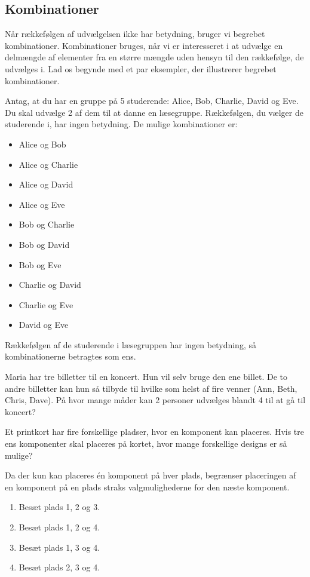 \subsection*{Kombinationer}

Når rækkefølgen af udvælgelsen ikke har betydning, bruger vi begrebet kombinationer. Kombinationer bruges, når vi er interesseret i at udvælge en delmængde af elementer fra en større mængde uden hensyn til den rækkefølge, de udvælges i. Lad os begynde med et par eksempler, der illustrerer begrebet kombinationer.

\begin{example}
    Antag, at du har en gruppe på 5 studerende: Alice, Bob, Charlie, David og Eve. Du skal udvælge 2 af dem til at danne en læsegruppe. Rækkefølgen, du vælger de studerende i, har ingen betydning. De mulige kombinationer er:
    \begin{itemize}
        \item Alice og Bob
        \item Alice og Charlie
        \item Alice og David
        \item Alice og Eve
        \item Bob og Charlie
        \item Bob og David
        \item Bob og Eve
        \item Charlie og David
        \item Charlie og Eve
        \item David og Eve
    \end{itemize}
    Rækkefølgen af de studerende i læsegruppen har ingen betydning, så kombinationerne betragtes som ens.
\end{example}

\begin{example}
    Maria har tre billetter til en koncert. Hun vil selv bruge den ene billet. De to andre billetter kan hun så tilbyde til hvilke som helst af fire venner (Ann, Beth, Chris, Dave). På hvor mange måder kan 2 personer udvælges blandt 4 til at gå til koncert?
\end{example}

\begin{example}
Et printkort har fire forskellige pladser, hvor en komponent kan placeres. Hvis tre ens komponenter skal placeres på kortet, hvor mange forskellige designs er så mulige?
\end{example}

\begin{solution}
    Da der kun kan placeres én komponent på hver plads, begrænser placeringen af en komponent på en plads straks valgmulighederne for den næste komponent.
        
    \begin{enumerate}
        \item Besæt plads 1, 2 og 3.
        \item Besæt plads 1, 2 og 4.
        \item Besæt plads 1, 3 og 4.
        \item Besæt plads 2, 3 og 4.
    \end{enumerate}
\end{solution}

